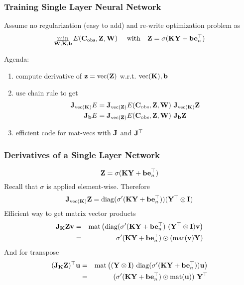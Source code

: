 \documentclass[12pt,fleqn,handout]{beamer}
\begin{document}
\begin{frame}\frametitle{Training Single Layer Neural Network}

Assume no regularization (easy to add) and re-write optimization problem as 
\begin{eqnarray*}
 \min_{{\bf W},{\bf K},{\bf b}}  E({\bf C}_{\rm obs}, {\bf Z},{\bf W} ) \quad \text{ with} \quad {\bf Z} = \sigma({\bf K}{\bf Y} + {\bf b} {\bf e}_n^\top)
\end{eqnarray*}

\bigskip
\pause

Agenda:
\begin{enumerate}
	\item compute derivative of ${\bf z}={\rm vec}({\bf Z})$ w.r.t. ${\rm vec}({\bf K}), {\bf b}$ 
	\item use chain rule to get
	\begin{align*}
		{\bf J}_{{\rm vec}({\bf K})} E  & = {\bf J}_{{\rm vec}({\bf Z})} E({\bf C}_{\rm obs},{\bf Z},{\bf W}) \ {\bf J}_{{\rm vec}({\bf K})} {\bf Z}\\
		{\bf J}_{{\bf b}} E  & = {\bf J}_{{\rm vec}({\bf Z})} E({\bf C}_{\rm obs},{\bf Z},{\bf W}) \ {\bf J}_{{\bf b}} {\bf Z}
	\end{align*}
	\item efficient code for mat-vecs with ${\bf J}$ and ${\bf J}^\top$
\end{enumerate} 
\end{frame}

\begin{frame}\frametitle{Derivatives of a Single Layer Network}
$$
{\bf Z} = \sigma({\bf K}{\bf Y} + {\bf b} {\bf e}_n^\top)
$$
Recall that $\sigma$ is applied element-wise. Therefore
$$
	{\bf J}_{{\rm vec}({\bf K})}{\bf Z} = {\rm diag}(\sigma'({\bf K} {\bf Y} + {\bf b} {\bf e}_n^\top)) ({\bf Y}^\top \otimes {\bf I})
$$
\pause
Efficient way to get matrix vector products
\begin{eqnarray*}
{\bf J}_{{\bf K}}{\bf Z} {\bf v} &=& {\rm mat} \left({\rm diag}(\sigma'({\bf K} {\bf Y} + {\bf b}{\bf e}_n^\top)\  ({\bf Y}^\top \otimes {\bf I}){\bf v}\right)\\
                            &=& \sigma'({\bf K} {\bf Y} + {\bf b} {\bf e}_n^\top) \odot ( {\rm mat}({\bf v}) {\bf Y} )
\end{eqnarray*}
And for transpose
\begin{eqnarray*}
({\bf J}_{{\bf K}}{\bf Z})^\top {\bf u} &=&  {\rm mat} \left( ({\bf Y} \otimes {\bf I}) \ {\rm diag}(\sigma'({\bf K} {\bf Y} + {\bf b}{\bf e}_n^\top)) {\bf u} \right)\\
                            &=& (\sigma'({\bf K} {\bf Y} + {\bf b}{\bf e}_n^\top) \odot  {\rm mat}({\bf u}))\  {\bf Y}^\top
\end{eqnarray*}

\end{frame}
\end{document}
